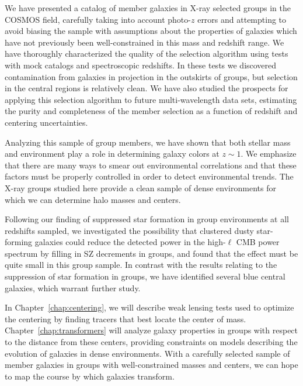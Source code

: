 We have presented a catalog of member galaxies in X-ray selected
groups in the COSMOS field, carefully taking into account photo-$z$
errors and attempting to avoid biasing the sample with assumptions
about the properties of galaxies which have not previously been
well-constrained in this mass and redshift range. We have thoroughly
characterized the quality of the selection algorithm using tests with
mock catalogs and spectroscopic redshifts. In these tests we
discovered contamination from galaxies in projection in the outskirts
of groups, but selection in the central regions is relatively clean. 
We have also studied the prospects for applying this selection
algorithm to future multi-wavelength data sets, estimating the purity
and completeness of the member selection as a function of redshift and
centering uncertainties.

Analyzing this sample of group members, we have shown that both
stellar mass and environment play a role in determining galaxy colors
at $z\sim 1$. We emphasize that there are many ways to smear out
environmental correlations and that these factors must be properly
controlled in order to detect environmental trends. The X-ray
groups studied here provide a clean sample of dense environments for
which we can determine halo masses and centers.

Following our finding of suppressed star formation in group
environments at all redshifts sampled, we investigated the possibility
that clustered dusty star-forming galaxies could reduce the detected power in the
high-$\ell$ CMB power spectrum by filling in SZ decrements in
groups, and found that the effect must be quite small in this group
sample. In contrast with the results relating to the suppression of
star formation in groups, we have identified several blue
central galaxies, which warrant further study.

In Chapter~\ref{chap:centering}, we
will describe weak lensing tests used to optimize the centering by
finding tracers that best locate the center of mass. Chapter~\ref{chap:transformers}
will analyze galaxy properties in groups with respect to the distance
from these centers, providing constraints on models describing the
evolution of galaxies in dense environments. With a
carefully selected sample of member galaxies in groups with
well-constrained masses and centers, we can hope to map the course by
which galaxies transform.
